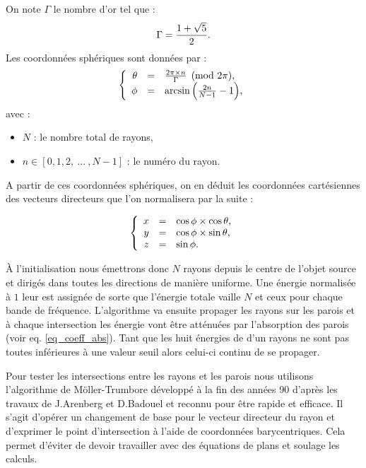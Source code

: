 On note $\Gamma$ le nombre d'or tel que :
\begin{equation}
\Gamma = \frac{1 + \sqrt{5}}{2}. \\
\end{equation}
%
Les coordonnées sphériques sont données par :
\begin{equation}
  \left \{
   \begin{array}{r c l}
\theta &=& \frac{2 \pi \times n}{\Gamma}  \pmod{2\pi},  \\
\phi &=& \arcsin{\left(\frac{2n}{N-1}-1\right)}, 
   \end{array}
   \right .
\end{equation}
%
avec : 
\begin{itemize}
\item $N$ : le nombre total de rayons,
\item $n \in[0, 1, 2, \ ... \ ,N-1]$ : le numéro du rayon.
\end{itemize}
%
A partir de ces coordonnées sphériques, on en déduit les coordonnées cartésiennes des vecteurs directeurs que l'on normalisera par la suite :

\begin{equation}
   \left \{
   \begin{array}{r c l}
x &=& \cos{\phi} \times \cos{\theta},  \\
y &=& \cos{\phi} \times \sin{\theta},  \\
z &=& \sin{\phi}.
   \end{array}
   \right .
\end{equation}


À l'initialisation nous émettrons donc $N$ rayons depuis le centre de l'objet source et dirigés dans toutes les directions de manière uniforme. Une énergie normalisée à $1$ leur est assignée de sorte que l'énergie totale vaille $N$ et ceux pour chaque bande de fréquence. L'algorithme va ensuite propager les rayons sur les parois et à chaque intersection les énergie vont être atténuées par l'absorption des parois (voir eq. \ref{eq_coeff_abs}). Tant que les huit énergies de d'un rayons ne sont pas toutes inférieures à une valeur seuil alors celui-ci continu de se propager. 

Pour tester les intersections entre les rayons et les parois nous utilisons l'algorithme de Möller-Trumbore \cite[p. 2-3]{moller} développé à la fin des années 90 d'après les travaux de J.Arenberg \cite{arenberg} et D.Badouel \cite[p. 390-393]{badouel} et reconnu pour être rapide et efficace. Il s'agit d'opérer un changement de base pour le vecteur directeur du rayon et d'exprimer le point d'intersection à l'aide de coordonnées barycentriques. Cela permet d'éviter de devoir travailler avec des équations de plans et soulage les calculs.

